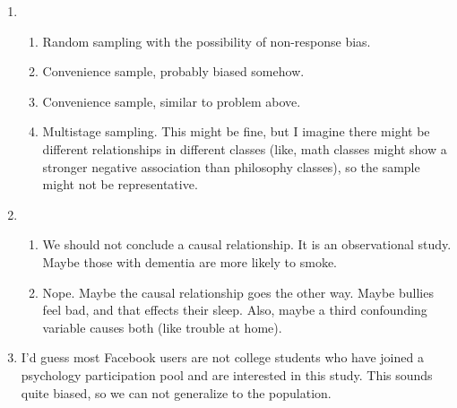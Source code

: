 \documentclass[12pt,letterpaper]{article}
\begin{document}
\begin{enumerate}
\item \begin{enumerate}
\item Random sampling with the possibility of non-response bias.
\item Convenience sample, probably biased somehow.
\item Convenience sample, similar to problem above.
\item Multistage sampling. This might be fine, but I imagine there might be different relationships in different classes (like, math classes might show a stronger negative association than philosophy classes), so the sample might not be representative.
\end{enumerate}

\item \begin{enumerate}
\item We should not conclude a causal relationship. It is an observational study. Maybe those with dementia are more likely to smoke.
\item Nope. Maybe the causal relationship goes the other way. Maybe bullies feel bad, and that effects their sleep. Also, maybe a third confounding variable causes both (like trouble at home).
\end{enumerate}

\item I'd guess most Facebook users are not college students who have joined a psychology participation pool and are interested in this study. This sounds quite biased, so we can not generalize to the population.

\end{enumerate}
\end{document}
